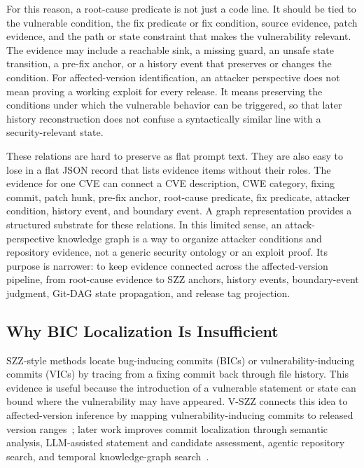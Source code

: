 For this reason, a root-cause predicate is not just a code line. It should be tied to the vulnerable condition, the fix predicate or fix condition, source evidence, patch evidence, and the path or state constraint that makes the vulnerability relevant. The evidence may include a reachable sink, a missing guard, an unsafe state transition, a pre-fix anchor, or a history event that preserves or changes the condition. For affected-version identification, an attacker perspective does not mean proving a working exploit for every release. It means preserving the conditions under which the vulnerable behavior can be triggered, so that later history reconstruction does not confuse a syntactically similar line with a security-relevant state.

These relations are hard to preserve as flat prompt text. They are also easy to lose in a flat JSON record that lists evidence items without their roles. The evidence for one CVE can connect a CVE description, CWE category, fixing commit, patch hunk, pre-fix anchor, root-cause predicate, fix predicate, attacker condition, history event, and boundary event. A graph representation provides a structured substrate for these relations. In this limited sense, an attack-perspective knowledge graph is a way to organize attacker conditions and repository evidence, not a generic security ontology or an exploit proof. Its purpose is narrower: to keep evidence connected across the affected-version pipeline, from root-cause evidence to SZZ anchors, history events, boundary-event judgment, Git-DAG state propagation, and release tag projection.

\subsection{Why BIC Localization Is Insufficient}

SZZ-style methods locate bug-inducing commits (BICs) or vulnerability-inducing commits (VICs) by tracing from a fixing commit back through file history. This evidence is useful because the introduction of a vulnerable statement or state can bound where the vulnerability may have appeared. V-SZZ connects this idea to affected-version inference by mapping vulnerability-inducing commits to released version ranges~\cite{vszz2022}; later work improves commit localization through semantic analysis, LLM-assisted statement and candidate assessment, agentic repository search, and temporal knowledge-graph search~\cite{tcszz2024,llm4szz2025,agentszz2026,howwhyagents2026,beyondblame2026}.

